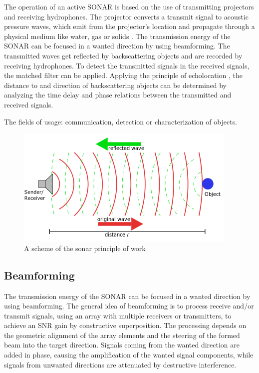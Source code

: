 \documentclass[11pt]{article}
\begin{document}
	The operation of an active SONAR is based on the use of transmitting projectors and receiving hydrophones. The projector converts a transmit signal to acoustic pressure waves, which emit from the projector's location and propagate through a physical medium like water, gas or solids \cite{hodges_underwater_2011}. The transmission energy of the SONAR can be focused in a wanted direction by using beamforming. The transmitted waves get reflected by backscattering objects and are recorded by receiving hydrophones. To detect the transmitted signals in the received signals, the matched filter can be applied. Applying the principle of echolocation \cite{ainslie_principles_2010}, the distance to and direction of backscattering objects can be determined by analyzing the time delay and phase relations between the transmitted and received signals.
	
	The fields of usage: communication, detection or characterization of objects.
	
	\begin{figure} [H][htbp] %
	   \centering
	   \includegraphics[width=0.6\linewidth]{figures/sonar_scheme.png} 
	   \caption{A scheme of the sonar principle of work}
	   \label{fig:sonar_scheme}
	\end{figure}
	
\subsection{Beamforming}
	The transmission energy of the SONAR can be focused in a wanted direction by using beamforming. The general idea of beamforming is to process receive and/or transmit signals, using an array with multiple receivers or transmitters, to achieve an SNR gain by constructive superposition. The processing depends on the geometric alignment of the array elements and the steering of the formed beam into the target direction. Signals coming from the wanted direction are added in phase, causing the amplification of the wanted signal components, while signals from unwanted directions are attenuated by destructive interference.
\end{document}
